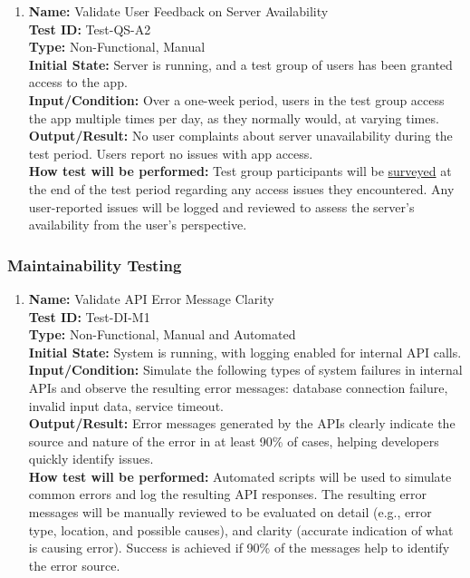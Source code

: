 \documentclass[12pt, titlepage]{article}
\begin{document}
\begin{enumerate}
\begin{enumerate}
\item \textbf{Name:} Validate User Feedback on Server Availability \label{itm:Test-QS-A2} \\
    \textbf{Test ID:} Test-QS-A2 \\
    \textbf{Type:} Non-Functional, Manual \\
    \textbf{Initial State:} Server is running, and a test group of users has been granted access to the app. \\
    \textbf{Input/Condition:} Over a one-week period, users in the test group access the app multiple times per day, as they normally would, at varying times. \\
    \textbf{Output/Result:} No user complaints about server unavailability during the test period. Users report no issues with app access. \\
    \textbf{How test will be performed:} Test group participants will be \hyperref[sub:usability_survey]{surveyed} at the end of the test period regarding any access issues they encountered. Any user-reported issues will be logged and reviewed to assess the server's availability from the user’s perspective.

\end{enumerate}
\subsubsection{Maintainability Testing}

\begin{enumerate}
    
\item \textbf{Name:} Validate API Error Message Clarity \label{itm:Test-DI-M1} \\
    \textbf{Test ID:} Test-DI-M1 \\
    \textbf{Type:} Non-Functional, Manual and Automated \\
    \textbf{Initial State:} System is running, with logging enabled for internal API calls. \\
    \textbf{Input/Condition:} Simulate the following types of system failures in internal APIs and observe the resulting error messages: database connection failure, invalid input data, service timeout. \\
    \textbf{Output/Result:} Error messages generated by the APIs clearly indicate the source and nature of the error in at least 90\% of cases, helping developers quickly identify issues. \\
    \textbf{How test will be performed:} Automated scripts will be used to simulate common errors and log the resulting API responses. The resulting error messages will be manually reviewed to be evaluated on detail (e.g., error type, location, and possible causes), and clarity (accurate indication of what is causing error). Success is achieved if 90\% of the messages help to identify the error source.



\end{enumerate}
\end{enumerate}
\end{document}
